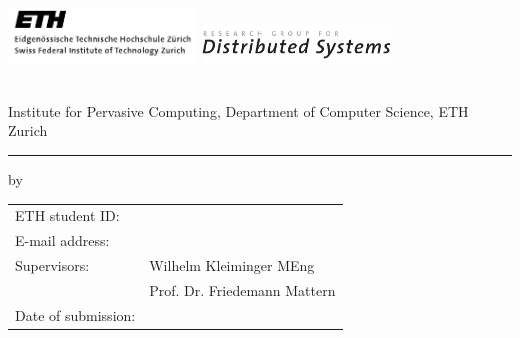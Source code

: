 \begin{titlepage}

	\flushleft
	
	\vspace*{-20mm}
	{
		\includegraphics[width=5cm]{images/logos/logo_ETH} 
		\hfill
		\includegraphics[width=5cm]{images/logos/logo_DSG}
	}
	  
  \vfill
  \vfill

  	{\Huge \sffamily \bfseries \thesisType}\\[3mm]Institute for Pervasive Computing, Department of Computer Science, ETH Zurich
  	\rule{\textwidth}{1mm}
  
  \vfill
	
	\begin{center}
	 		\Huge \sffamily \bfseries
	 		\thesisTitle
 	\end{center}
 	
 	\vspace{10pt}
 	
 	\begin{center}
 		\Large
  		by \thesisAuthor
	
 	\end{center}
 	
 	\vspace{10pt}
  
  \begin{center}
 		\Large
 		\thesisSemester
 	\end{center}
  
  \vfill
  \vfill
  \vfill
  
  	\setlength{\tabcolsep}{0mm}
		\begin{tabular}{p{40mm}l}
			ETH student ID:     & \thesisETHID \\[1mm]
			E-mail address:     & \thesisEmail \\[5mm]
			Supervisors:       & Wilhelm Kleiminger MEng\\[1mm]
			                    & Prof. Dr. Friedemann Mattern\\[5mm]
			Date of submission: & \thesisSubmission
		\end{tabular}
	
\end{titlepage}

\thispagestyle{empty}
\begin{center}
\parbox{0mm}{}
\end{center}